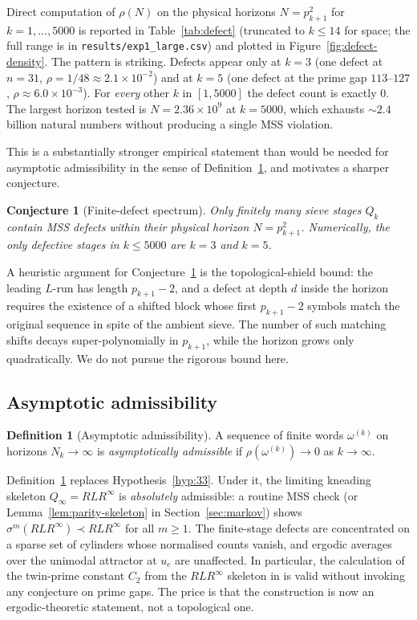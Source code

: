 \documentclass{iopjournal}
\newtheorem{conjecture}{Conjecture}
\theoremstyle{definition}
\newtheorem{definition}{Definition}
\begin{document}
Direct computation of $\rho(N)$ on the physical horizons
$N = p_{k+1}^2$ for $k = 1, \ldots, 5000$ is reported in
Table~\ref{tab:defect} (truncated to $k \leq 14$ for space; the full
range is in \texttt{results/exp1\_large.csv}) and plotted in
Figure~\ref{fig:defect-density}. The pattern is striking. Defects
appear only at $k = 3$ (one defect at $n = 31$,
$\rho = 1/48 \approx 2.1 \times 10^{-2}$) and at $k = 5$ (one defect at
the prime gap $113$--$127$, $\rho \approx 6.0 \times 10^{-3}$). For
\emph{every} other $k$ in $[1, 5000]$ the defect count is exactly $0$.
The largest horizon tested is $N = 2.36 \times 10^9$ at $k = 5000$,
which exhausts $\sim 2.4$ billion natural numbers without producing a
single MSS violation.

This is a substantially stronger empirical statement than would be
needed for asymptotic admissibility in the sense of
Definition~\ref{def:asymp-admiss}, and motivates a sharper conjecture.

\begin{conjecture}[Finite-defect spectrum]
\label{conj:finite-defects}
Only finitely many sieve stages $Q_k$ contain MSS defects within their
physical horizon $N = p_{k+1}^2$. Numerically, the only defective stages
in $k \leq 5000$ are $k = 3$ and $k = 5$.
\end{conjecture}

A heuristic argument for Conjecture~\ref{conj:finite-defects} is the
topological-shield bound: the leading $L$-run has length $p_{k+1} - 2$,
and a defect at depth $d$ inside the horizon requires the existence of
a shifted block whose first $p_{k+1} - 2$ symbols match the original
sequence in spite of the ambient sieve. The number of such matching
shifts decays super-polynomially in $p_{k+1}$, while the horizon grows
only quadratically. We do not pursue the rigorous bound here.

\subsection{Asymptotic admissibility}

\begin{definition}[Asymptotic admissibility]
\label{def:asymp-admiss}
A sequence of finite words $\omega^{(k)}$ on horizons $N_k \to \infty$
is \emph{asymptotically admissible} if $\rho(\omega^{(k)}) \to 0$ as
$k \to \infty$.
\end{definition}

Definition~\ref{def:asymp-admiss} replaces Hypothesis~\ref{hyp:33}.
Under it, the limiting kneading skeleton $Q_\infty = R L R^\infty$ is
\emph{absolutely} admissible: a routine MSS check (or
Lemma~\ref{lem:parity-skeleton} in Section~\ref{sec:markov}) shows
$\sigma^m(R L R^\infty) \prec R L R^\infty$ for all $m \geq 1$. The
finite-stage defects are concentrated on a sparse set of cylinders
whose normalised counts vanish, and ergodic averages over the unimodal
attractor at $u_c$ are unaffected. In particular, the calculation of
the twin-prime constant $C_2$ from the $RLR^\infty$ skeleton in
\cite{wang2026emergence} is valid without invoking any conjecture on
prime gaps. The price is that the construction is now an
ergodic-theoretic statement, not a topological one.
\end{document}
